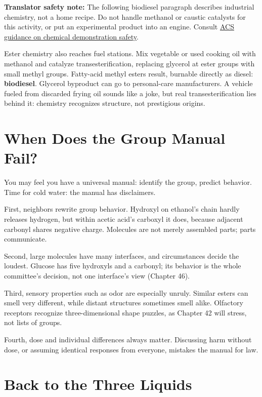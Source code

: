 \textbf{Translator safety note:} The following biodiesel paragraph describes industrial chemistry, not a home recipe. Do not handle methanol or caustic catalysts for this activity, or put an experimental product into an engine. Consult \href{https://institute.acs.org/acs-center/lab-safety/education-training/safer-experiments.html}{ACS guidance on chemical demonstration safety}.

Ester chemistry also reaches fuel stations. Mix vegetable or used cooking oil with methanol and catalyze transesterification, replacing glycerol at ester groups with small methyl groups. Fatty-acid methyl esters result, burnable directly as diesel: \textbf{biodiesel}. Glycerol byproduct can go to personal-care manufacturers. A vehicle fueled from discarded frying oil sounds like a joke, but real transesterification lies behind it: chemistry recognizes structure, not prestigious origins.

\section{When Does the Group Manual Fail?}

You may feel you have a universal manual: identify the group, predict behavior. Time for cold water: the manual has disclaimers.

First, neighbors rewrite group behavior. Hydroxyl on ethanol's chain hardly releases hydrogen, but within acetic acid's carboxyl it does, because adjacent carbonyl shares negative charge. Molecules are not merely assembled parts; parts communicate.

Second, large molecules have many interfaces, and circumstances decide the loudest. Glucose has five hydroxyls and a carbonyl; its behavior is the whole committee's decision, not one interface's view (Chapter 46).

Third, sensory properties such as odor are especially unruly. Similar esters can smell very different, while distant structures sometimes smell alike. Olfactory receptors recognize three-dimensional shape puzzles, as Chapter 42 will stress, not lists of groups.

Fourth, dose and individual differences always matter. Discussing harm without dose, or assuming identical responses from everyone, mistakes the manual for law.

\section{Back to the Three Liquids}

